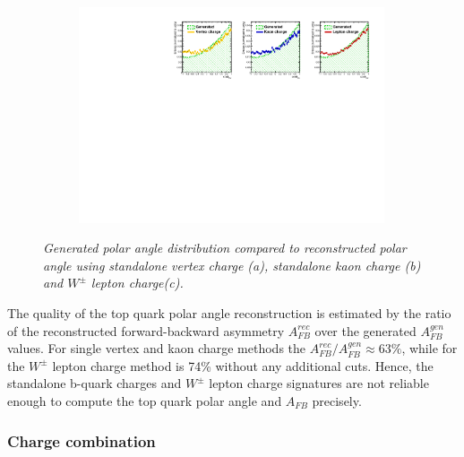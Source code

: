 \begin{figure}
\begin{subfigure}{0.33\textwidth}
		\includegraphics[clip, trim=13.6cm 0cm 0.4cm 0.cm,width=0.99\textwidth]{ILD/plots/one-charge.pdf}
		\caption{\label{fig:OneCharge_c_3} }
	\end{subfigure}
	\caption{\sl Generated polar angle distribution compared to reconstructed polar angle using standalone vertex charge (a), standalone kaon charge (b) and $W^\pm$ lepton charge(c). }
	
	\label{fig:OneCharge_3}
\end{figure}

The quality of the top quark polar angle reconstruction is estimated by the ratio of the reconstructed forward-backward asymmetry $A_{FB}^{rec}$ over the generated $A^{gen}_{FB}$ values.
For single vertex and kaon charge methods the $A_{FB}^{rec}/A^{gen}_{FB} \approx 63\%$, while for the $W^\pm$ lepton charge method is 74\% without any additional cuts. 
Hence, the standalone b-quark charges and $W^\pm$ lepton charge signatures are not reliable enough to compute the top quark polar angle and $A_{FB}$ precisely. 
\subsubsection{Charge combination}\label{sec:ChargeOverview}


